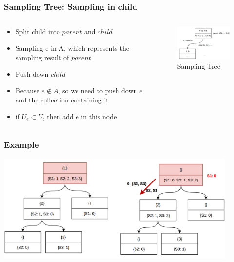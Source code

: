 \documentclass[notheorems, aspectratio=54]{beamer}
\begin{document}
\begin{frame}
    \frametitle{Sampling Tree: Sampling in child}
    \begin{columns}
        \begin{column}{0.48\textwidth}
            \begin{itemize}
                \item Split child into $parent$ and $child$
                \item Sampling e in A, which represents the sampling result of $parent$
                \item Push down $child$
                \item Because $e \notin A$, so we need to push down $e$ and the collection containing it
                \item if $U_e \subset U$, then add e in this node
            \end{itemize}
        \end{column}
        \begin{column}{0.48\textwidth}
            \begin{figure}
                \centering
                \includegraphics[width=6cm]{global_img_dir/sp1.png}
                \caption{Sampling Tree}
            \end{figure}
        \end{column}
    \end{columns}
\end{frame}

\begin{frame}
    \frametitle{Example}
    \centering
    \includegraphics[width=12cm]{global_img_dir/exa1.png}
\end{frame}
\end{document}
